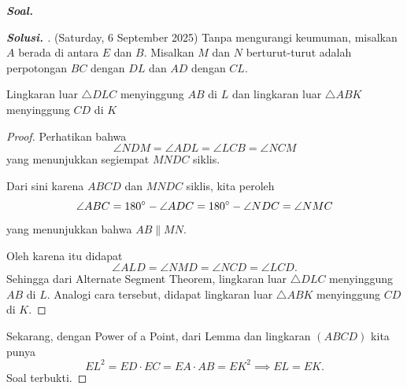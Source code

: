 \textbf{\textit{Soal.}} 
\begin{proof}[\textbf{Solusi. }] (Saturday, 6 September 2025) Tanpa mengurangi keumuman, misalkan $A$ berada di antara $E$ dan $B$. Misalkan $M$ dan $N$ berturut-turut adalah perpotongan $BC$ dengan $DL$ dan $AD$ dengan $CL$.

    

    \begin{lemmarev}Lingkaran luar $\triangle DLC$ menyinggung $AB$ di $L$ dan lingkaran luar $\triangle ABK$ menyinggung $CD$ di $K$

    \begin{proof} Perhatikan bahwa 
    $$\angle NDM = \angle ADL = \angle LCB = \angle NCM$$
    yang menunjukkan segiempat $MNDC$ siklis.

    Dari sini karena $ABCD$ dan $MNDC$ siklis, kita peroleh
    $$\angle ABC = 180^\circ - \angle ADC = 180^\circ - \angle NDC = \angle NMC$$
    yang menunjukkan bahwa $AB \parallel MN$.

    Oleh karena itu didapat
    $$\angle ALD = \angle NMD = \angle NCD = \angle LCD.$$
    Sehingga dari Alternate Segment Theorem, lingkaran luar $\triangle DLC$ menyinggung $AB$ di $L$. Analogi cara tersebut, didapat lingkaran luar $\triangle ABK$ menyinggung $CD$ di $K$.
    \end{proof}
    \end{lemmarev}

    Sekarang, dengan Power of a Point, dari Lemma dan lingkaran $(ABCD)$ kita punya 
    $$EL^2 = ED \cdot EC = EA \cdot AB = EK^2 \implies EL = EK.$$
    Soal terbukti.

\end{proof}